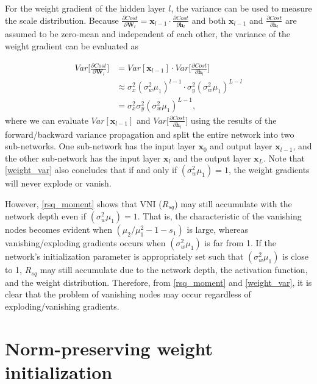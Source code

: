 For the weight gradient of the hidden layer $l$, the variance can be used to measure the scale distribution. Because $\frac{\partial Cost}{\partial \mathbf{W}_l}
=\mathbf{x}_{l-1}\cdot\frac{\partial Cost}{\partial \mathbf{h}_l}$ and both $\mathbf{x}_{l-1}$ and $\frac{\partial Cost}{\partial \mathbf{h}_l}$ are assumed to be zero-mean and independent of each other, the variance of the weight gradient can be evaluated as

\begin{equation}
    \begin{aligned}
    Var\Big[\frac{\partial Cost}{\partial \mathbf{W}_l}\Big]
    &=
    Var[\mathbf{x}_{l-1}]\cdot
    Var\Big[\frac{\partial Cost}{\partial \mathbf{h}_l}\Big]\\
    &
    \approx
    \sigma_x^2(\sigma_w^2\mu_1)^{l-1}\cdot
    \sigma_y^2(\sigma_w^2\mu_1)^{L-l}\\
    &=
    \sigma_x^2\sigma_y^2(\sigma_w^2\mu_1)^{L-1},
    \end{aligned}
    \label{weight_var}
\end{equation}
where we can evaluate $Var[\mathbf{x}_{l-1}]$ and $Var\Big[\frac{\partial Cost}{\partial \mathbf{h}_l}\Big]$ using the results of the forward/backward variance propagation and split the entire network into two sub-networks. One sub-network has the input layer $\mathbf{x}_{0}$ and output layer $\mathbf{x}_{l-1}$, and the other sub-network has the input layer $\mathbf{x}_{l}$ and the output layer $\mathbf{x}_{L}$. Note that \eqref{weight_var} also concludes that if and only if $(\sigma_w^2\mu_1)=1$, the weight gradients will never explode or vanish.

However, \eqref{rsq_moment} shows that VNI ($R_{sq}$) may still accumulate with the network depth even if $(\sigma_w^2\mu_1)=1$. That is, the characteristic of the vanishing nodes becomes evident  when $(\mu_2/\mu_1^2-1-s_1)$ is large, whereas vanishing/exploding gradients occurs when $(\sigma_w^2\mu_1)$ is far from 1. If the network's initialization parameter is appropriately set such that $(\sigma_w^2\mu_1)$ is close to 1, $R_{sq}$ may still accumulate due to the network depth, the activation function, and the weight distribution. Therefore, from \eqref{rsq_moment} and \eqref{weight_var}, it is clear that the problem of vanishing nodes  may occur regardless of  exploding/vanishing gradients.

\section{Norm-preserving weight initialization} \label{comp:init}


